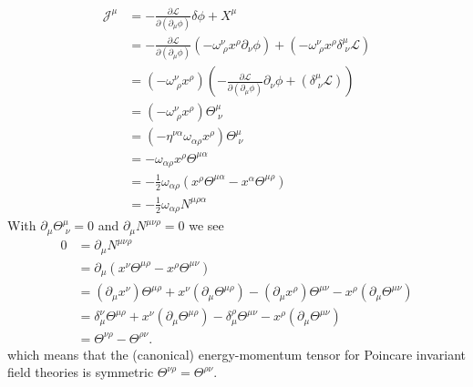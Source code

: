 \documentclass[10pt,a4paper]{article}
\theoremstyle{definition}
\begin{document}
\begin{align}
    \mathcal{J}^\mu&=-\frac{\partial\mathcal{L}}{\partial(\partial_\mu\phi)}\delta\phi+X^\mu\\
    &=-\frac{\partial\mathcal{L}}{\partial(\partial_\mu\phi)}(-\omega^\nu_{\;\rho}x^\rho\partial_\nu\phi)+(-\omega^\nu_{\;\rho}x^\rho\delta^\mu_{\;\nu}\mathcal{L})\\
    &=(-\omega^\nu_{\;\rho}x^\rho)\left(-\frac{\partial\mathcal{L}}{\partial(\partial_\mu\phi)}\partial_\nu\phi+(\delta^\mu_{\;\nu}\mathcal{L})\right)\\
    &=(-\omega^\nu_{\;\rho}x^\rho)\Theta^\mu_{\;\nu}\\
    &=(-\eta^{\nu\alpha}\omega_{\alpha\rho}x^\rho)\Theta^\mu_{\;\nu}\\
    &=-\omega_{\alpha\rho}x^\rho\Theta^{\mu\alpha}\\
    &=-\frac{1}{2}\omega_{\alpha\rho}(x^\rho\Theta^{\mu\alpha}-x^\alpha\Theta^{\mu\rho})\\
    &=-\frac{1}{2}\omega_{\alpha\rho}N^{\mu\rho\alpha}
\end{align}
With $\partial_\mu\Theta^\mu_{\;\nu}=0$ and $\partial_\mu N^{\mu\nu\rho}=0$ we see
\begin{align}
    0&=\partial_\mu N^{\mu\nu\rho}\\
    &= \partial_\mu\left( x^\nu\Theta^{\mu\rho}-x^\rho\Theta^{\mu\nu}\right)\\
    &= (\partial_\mu x^\nu) \Theta^{\mu\rho}+  x^\nu (\partial_\mu \Theta^{\mu\rho}) -(\partial_\mu x^\rho)\Theta^{\mu\nu} - x^\rho (\partial_\mu\Theta^{\mu\nu})\\
    &= \delta_\mu^\nu \Theta^{\mu\rho}+  x^\nu (\partial_\mu \Theta^{\mu\rho}) -\delta_\mu^\rho\Theta^{\mu\nu} - x^\rho (\partial_\mu\Theta^{\mu\nu})\\
    &= \Theta^{\nu\rho} - \Theta^{\rho\nu}.
\end{align}
which means that the (canonical) energy-momentum tensor for Poincare invariant field theories is symmetric $\Theta^{\nu\rho} = \Theta^{\rho\nu}$.
\end{document}
